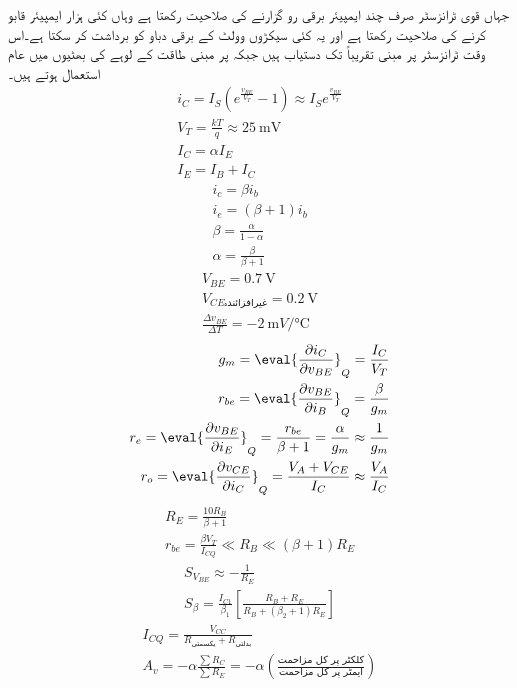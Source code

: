 جہاں قوی ٹرانزسٹر صرف چند ایمپیئر برقی رو گزارنے کی صلاحیت رکھتا ہے وہاں  کئی ہزار ایمپیئر قابو کرنے کی صلاحیت رکھتا ہے اور یہ کئی سیکڑوں وولٹ کے برقی دباو کو برداشت کر سکتا ہے۔اس وقت ٹرانزسٹر پر مبنی  تقریباً  تک دستیاب ہیں جبکہ  پر مبنی   طاقت کے لوہے کی بھٹیوں میں عام استعمال ہوتے ہیں۔
\newpage
{}
\begin{align*}
i_C=I_S \left(e^{\frac{v_{BE}}{V_T}} -1\right) \approx I_S e^{\frac{v_{BE}}{V_T}}\\
V_T =\frac{k T}{q} \approx \SI{25}{\milli \volt}\\
I_C=\alpha I_E\\
I_E=I_B+I_C
\end{align*}
%
\begin{align*}
i_c =\beta i_b\\
i_e=\left(\beta+1 \right) i_b\\
\beta=\frac{\alpha}{1-\alpha}\\
\alpha=\frac{\beta}{\beta+1}
\end{align*}
%
\begin{align*}
V_{BE}=\SI{0.7}{\volt}\\
V_{CE \textrm{غیرافزائندہ}}=\SI{0.2}{\volt}\\
\frac{\Delta v_{BE}}{\Delta T}=\SI[per=frac,fraction=nice]{-2}{ \milli V \per \celsius}
\end{align*}
%
\begin{align*}
g_m=\eval{\frac{\partial i_C}{\partial v_{BE}}}_{Q}=\frac{I_C}{V_T}\\
r_{be}=\eval{\frac{\partial v_{BE}}{\partial  i_B}}_{Q}=\frac{\beta}{g_m}\\
r_e=\eval{\frac{\partial v_{BE}}{\partial  i_E}}_{Q}=\frac{r_{be}}{\beta+1}=\frac{\alpha}{g_m}\approx \frac{1}{g_m}\\
r_o =\eval{\frac{\partial v_{CE}}{\partial  i_C}}_{Q}= \frac{V_A+V_{CE}}{I_C} \approx \frac{V_A}{I_C}
\end{align*}
%
\begin{align*}
R_E=\frac{10 R_B}{\beta+1}\\
r_{be} =\frac{\beta V_T}{I_{CQ}} \ll R_B \ll \left(\beta+1\right) R_E
\end{align*}
%
\begin{align*}
S_{V_{BE}} \approx -\frac{1}{R_E}\\
S_{\beta}=\frac{I_{C1}}{\beta_1} \left[\frac{R_B+R_E}{R_B+\left(\beta_2+1 \right)R_E} \right]
\end{align*}
%
\begin{align*}
I_{CQ}=\frac{V_{CC}}{R_{\textrm{یکسمتی}}+R_{\textrm{بدلتی}}}\\
A_v=-\alpha \frac{\sum R_C}{\sum R_E}=-\alpha \left(\frac{\textrm{کلکٹر پر کل مزاحمت}}{\textrm{ایمٹر پر کل مزاحمت}} \right)
\end{align*}

